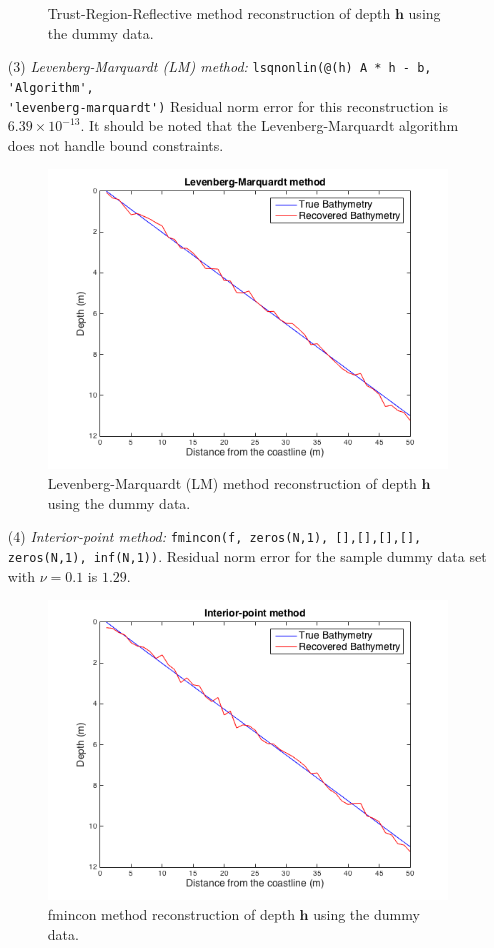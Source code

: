 \begin{itemize}
\begin{figure}[H]
\caption{Trust-Region-Reflective method reconstruction of depth $\mathbf{h}$ using the dummy data.}
\label{trust_region_fig}
\end{figure}
\item[(3)]  \textit{Levenberg-Marquardt (LM) method:}  
\verb|lsqnonlin(@(h) A * h - b, 'Algorithm',| \\ \verb|'levenberg-marquardt')|
Residual norm error for this reconstruction is $6.39 \times 10^{-13}$. It should be noted that the Levenberg-Marquardt algorithm does not handle bound constraints. 
\begin{figure}[H]
\center
\includegraphics[scale=0.6]{img/LM_linear.png} 
\caption{Levenberg-Marquardt (LM) method reconstruction of depth $\mathbf{h}$ using the dummy data.}
\label{LM_fig}
\end{figure}
\item[(4)]  \textit{Interior-point method:} \verb|fmincon(f, zeros(N,1), [],[],[],[], zeros(N,1), inf(N,1))|. Residual norm error for the sample dummy data set  with $\nu = 0.1$ is $1.29$. 
\begin{figure}[H]
\center
\includegraphics[scale=0.6]{img/fmincon_linear.png} 
\caption{fmincon method reconstruction of depth $\mathbf{h}$ using the dummy data.}
\label{LM_fig}
\end{figure}
\end{itemize}



